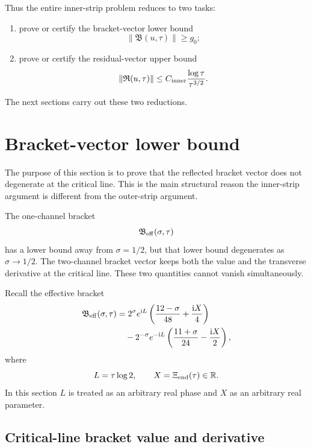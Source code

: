 \documentclass[11pt]{article}
\newcommand{\ii}{\mathrm{i}}
\newcommand{\Beff}{\mathfrak B_{\rm eff}}
\newcommand{\Bvec}{\mathfrak B}
\newcommand{\Rvec}{\mathfrak R}
\newcommand{\gev}{g_0}
\newcommand{\Cinner}{C_{\rm inner}}
\begin{document}
Thus the entire inner-strip problem reduces to two tasks:

\begin{enumerate}[label=(\roman*)]
    \item prove or certify the bracket-vector lower bound
    \[
        \|\Bvec(u,\tau)\|\ge \gev;
    \]

    \item prove or certify the residual-vector upper bound
    \[
        \|\Rvec(u,\tau)\|
        \le
        \Cinner
        \frac{\log\tau}{\tau^{3/2}}.
    \]
\end{enumerate}

The next sections carry out these two reductions.



\section{Bracket-vector lower bound}
\label{sec:bracket-vector}

The purpose of this section is to prove that the reflected bracket vector does
not degenerate at the critical line.  This is the main structural reason the
inner-strip argument is different from the outer-strip argument.

The one-channel bracket
\[
        \Beff(\sigma,\tau)
\]
has a lower bound away from \(\sigma=1/2\), but that lower bound degenerates as
\(\sigma\to1/2\).  The two-channel bracket vector keeps both the value and the
transverse derivative at the critical line.  These two quantities cannot vanish
simultaneously.

Recall the effective bracket
\[
\begin{aligned}
        \Beff(\sigma,\tau)
        &=
        2^\sigma e^{\ii L}
        \left(
        \frac{12-\sigma}{48}
        +
        \frac{\ii X}{4}
        \right)
\\
        &\quad
        -
        2^{-\sigma}e^{-\ii L}
        \left(
        \frac{11+\sigma}{24}
        -
        \frac{\ii X}{2}
        \right),
\end{aligned}
\]
where
\[
        L=\tau\log2,
        \qquad
        X=\Xi_{\rm end}(\tau)\in\mathbb R.
\]
In this section \(L\) is treated as an arbitrary real phase and \(X\) as an
arbitrary real parameter.

\subsection{Critical-line bracket value and derivative}
\end{document}
